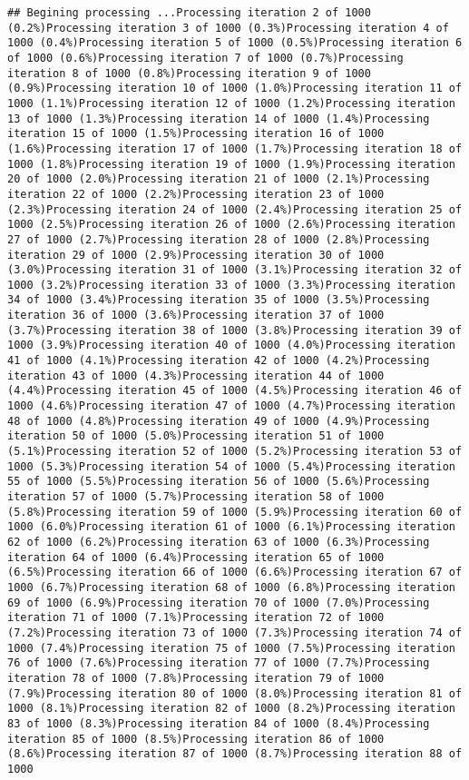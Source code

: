 \documentclass[
]{article}
\begin{document}
\begin{verbatim}
## Begining processing ...Processing iteration 2 of 1000 (0.2%)Processing iteration 3 of 1000 (0.3%)Processing iteration 4 of 1000 (0.4%)Processing iteration 5 of 1000 (0.5%)Processing iteration 6 of 1000 (0.6%)Processing iteration 7 of 1000 (0.7%)Processing iteration 8 of 1000 (0.8%)Processing iteration 9 of 1000 (0.9%)Processing iteration 10 of 1000 (1.0%)Processing iteration 11 of 1000 (1.1%)Processing iteration 12 of 1000 (1.2%)Processing iteration 13 of 1000 (1.3%)Processing iteration 14 of 1000 (1.4%)Processing iteration 15 of 1000 (1.5%)Processing iteration 16 of 1000 (1.6%)Processing iteration 17 of 1000 (1.7%)Processing iteration 18 of 1000 (1.8%)Processing iteration 19 of 1000 (1.9%)Processing iteration 20 of 1000 (2.0%)Processing iteration 21 of 1000 (2.1%)Processing iteration 22 of 1000 (2.2%)Processing iteration 23 of 1000 (2.3%)Processing iteration 24 of 1000 (2.4%)Processing iteration 25 of 1000 (2.5%)Processing iteration 26 of 1000 (2.6%)Processing iteration 27 of 1000 (2.7%)Processing iteration 28 of 1000 (2.8%)Processing iteration 29 of 1000 (2.9%)Processing iteration 30 of 1000 (3.0%)Processing iteration 31 of 1000 (3.1%)Processing iteration 32 of 1000 (3.2%)Processing iteration 33 of 1000 (3.3%)Processing iteration 34 of 1000 (3.4%)Processing iteration 35 of 1000 (3.5%)Processing iteration 36 of 1000 (3.6%)Processing iteration 37 of 1000 (3.7%)Processing iteration 38 of 1000 (3.8%)Processing iteration 39 of 1000 (3.9%)Processing iteration 40 of 1000 (4.0%)Processing iteration 41 of 1000 (4.1%)Processing iteration 42 of 1000 (4.2%)Processing iteration 43 of 1000 (4.3%)Processing iteration 44 of 1000 (4.4%)Processing iteration 45 of 1000 (4.5%)Processing iteration 46 of 1000 (4.6%)Processing iteration 47 of 1000 (4.7%)Processing iteration 48 of 1000 (4.8%)Processing iteration 49 of 1000 (4.9%)Processing iteration 50 of 1000 (5.0%)Processing iteration 51 of 1000 (5.1%)Processing iteration 52 of 1000 (5.2%)Processing iteration 53 of 1000 (5.3%)Processing iteration 54 of 1000 (5.4%)Processing iteration 55 of 1000 (5.5%)Processing iteration 56 of 1000 (5.6%)Processing iteration 57 of 1000 (5.7%)Processing iteration 58 of 1000 (5.8%)Processing iteration 59 of 1000 (5.9%)Processing iteration 60 of 1000 (6.0%)Processing iteration 61 of 1000 (6.1%)Processing iteration 62 of 1000 (6.2%)Processing iteration 63 of 1000 (6.3%)Processing iteration 64 of 1000 (6.4%)Processing iteration 65 of 1000 (6.5%)Processing iteration 66 of 1000 (6.6%)Processing iteration 67 of 1000 (6.7%)Processing iteration 68 of 1000 (6.8%)Processing iteration 69 of 1000 (6.9%)Processing iteration 70 of 1000 (7.0%)Processing iteration 71 of 1000 (7.1%)Processing iteration 72 of 1000 (7.2%)Processing iteration 73 of 1000 (7.3%)Processing iteration 74 of 1000 (7.4%)Processing iteration 75 of 1000 (7.5%)Processing iteration 76 of 1000 (7.6%)Processing iteration 77 of 1000 (7.7%)Processing iteration 78 of 1000 (7.8%)Processing iteration 79 of 1000 (7.9%)Processing iteration 80 of 1000 (8.0%)Processing iteration 81 of 1000 (8.1%)Processing iteration 82 of 1000 (8.2%)Processing iteration 83 of 1000 (8.3%)Processing iteration 84 of 1000 (8.4%)Processing iteration 85 of 1000 (8.5%)Processing iteration 86 of 1000 (8.6%)Processing iteration 87 of 1000 (8.7%)Processing iteration 88 of 1000 
\end{verbatim}
\end{document}
